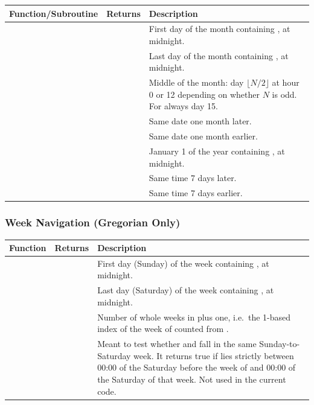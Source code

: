 \begin{longtable}{L{4.5cm} L{4cm} L{5.5cm}}
  \toprule
  \textbf{Function/Subroutine} & \textbf{Returns} & \textbf{Description} \\
  \midrule
  \endhead
  \bottomrule
  \endfoot
    &  &
    First day of the month containing , at midnight. \\
     &  &
    Last day of the month containing , at midnight. \\
   &  &
    Middle of the month: day $\lfloor N/2 \rfloor$ at hour 0 or 12
    depending on whether $N$ is odd. For  always day 15. \\
     &  &
    Same date one month later. \\
     &  &
    Same date one month earlier. \\
     &  &
    January 1 of the year containing , at midnight. \\
      &  &
    Same time 7 days later. \\
      &  &
    Same time 7 days earlier. \\
\end{longtable}

\subsubsection{Week Navigation (Gregorian Only)}

\begin{longtable}{L{4.5cm} L{4cm} L{5.5cm}}
  \toprule
  \textbf{Function} & \textbf{Returns} & \textbf{Description} \\
  \midrule
  \endhead
  \bottomrule
  \endfoot
   &  &
    First day (Sunday) of the week containing , at midnight. \\
   &  &
    Last day (Saturday) of the week containing , at midnight. \\
  &  &
    Number of whole weeks in  plus one, i.e.\ the 1-based index
    of the week of  counted from . \\
   &  &
    Meant to test whether  and  fall in the same
    Sunday-to-Saturday week. It returns true if  lies strictly
    between 00:00 of the Saturday before the week of  and 00:00 of
    the Saturday of that week. Not used in the current code. \\
\end{longtable}

